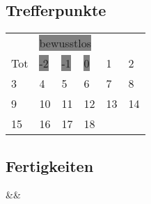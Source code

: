 \documentclass[a4paper,twoside]{article}
\newlength{\remaining}
\newcommand\underlinedtext[2]{
    \setlength{\remaining}{#2-\widthof{#1}}
    \text{\underline{#1\hspace*{\remaining}}}
}
\newcommand\skill[2]{
    \noindent
    \ding{111}
    \ifx&#1&%
        \text{\underline{\hspace*{5cm}}}%
    \else
        \normalsize{#1}\dotfill%
    \fi
    \underlinedtext{#2}{0.5cm}
    \newline
}
\begin{document}
\begin{Row}
\begin{Cell}{1}
        \subsection*{Trefferpunkte}
        \begin{tabular}{ | m{2.5mm} m{2.5mm} m{2.5mm} m{2.5mm} m{2.5mm} m{2.5mm} | }
            \hline
            & \multicolumn{3}{l}{\colorbox{Gray}{\small{bewusstlos}}} & & \\
            \footnotesize{Tot} &
            \colorbox{Gray}{\footnotesize{-2}} &
            \colorbox{Gray}{\footnotesize{-1}} &
            \colorbox{Gray}{\footnotesize{0}} &
            \footnotesize{1} &
            \footnotesize{2} \\
            \footnotesize{3} &
            \footnotesize{4} &
            \footnotesize{5} &
            \footnotesize{6} &
            \footnotesize{7} &
            \footnotesize{8} \\
            \footnotesize{9} &
            \footnotesize{10} &
            \footnotesize{11} &
            \footnotesize{12} &
            \footnotesize{13} &
            \footnotesize{14} \\
            \footnotesize{15} &
            \footnotesize{16} &
            \footnotesize{17} &
            \footnotesize{18} &
            & \\
            \hline
        \end{tabular}
    \end{Cell}
\end{Row}

\subsection*{Fertigkeiten}
\begin{multicols}{3}
\allskills
{}
%
{%
	\skill{}{}
}
\end{multicols}
\end{document}
